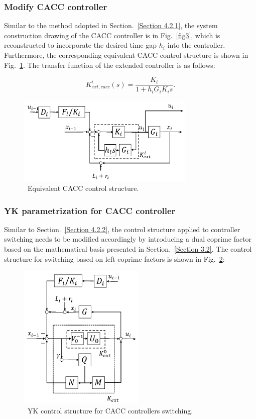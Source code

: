 \documentclass[trsc,nonblindrev]{informs3} %
\begin{document}
\subsubsection{Modify CACC controller}
\label{Section 4.2.3}

Similar to the method adopted in Section.~\ref{Section 4.2.1}, the system construction drawing of the CACC controller is in Fig.~\ref{fig3}, which is reconstructed to incorporate the desired time gap $h_i$ into the controller. Furthermore, the corresponding equivalent CACC control structure is shown in Fig.~\ref{fig7}. The transfer function of the extended controller is as follows:

\begin{equation}
    K_{e x t, c a c c}^{i}(s)=\frac{K_{i}}{1+h_{i} G_{i} K_{i} s}.
\end{equation}

\begin{figure}
    \centering
    \includegraphics[width=8.5cm]{figs/fig7.png}
    \caption{~Equivalent CACC control structure.}
    \label{fig7}
\end{figure}

\subsubsection{YK parametrization for CACC controller}
\label{Section 4.2.4}

Similar to Section.~\ref{Section 4.2.2}, the control structure applied to controller switching needs to be modified accordingly by introducing a dual coprime factor based on the mathematical basis presented in Section.~\ref{Section 3.2}. The control structure for switching based on left coprime factors is shown in Fig.~\ref{fig8}:

\begin{figure}
    \centering
    \includegraphics[width=6cm]{figs/fig8.png}
    \caption{~YK control structure for CACC controllers switching.}
    \label{fig8}
\end{figure}
\end{document}
